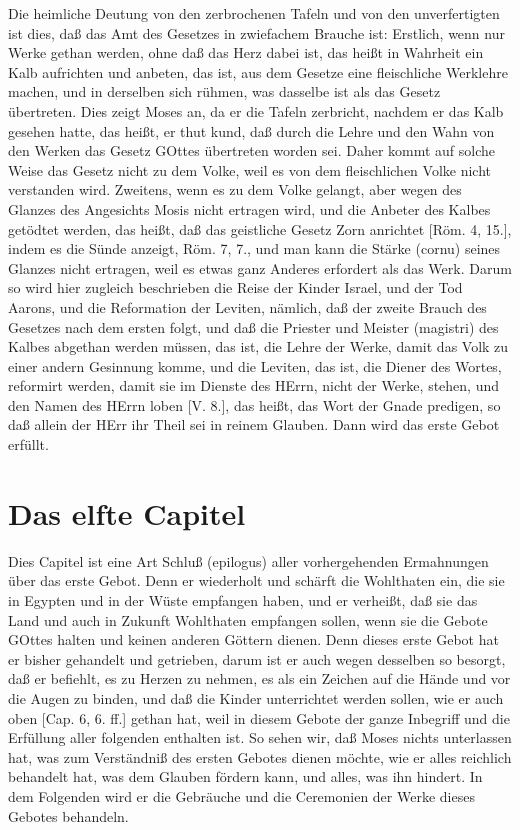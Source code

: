 Die heimliche Deutung von den zerbrochenen Tafeln und von den unverfertigten ist dies, daß das Amt des Gesetzes in zwiefachem Brauche ist: Erstlich, wenn nur Werke gethan werden, ohne daß das Herz dabei ist, das heißt in Wahrheit ein Kalb aufrichten und anbeten, das ist, aus dem Gesetze eine fleischliche Werklehre machen, und in derselben sich rühmen, was dasselbe ist als das Gesetz übertreten. Dies zeigt Moses an, da er die Tafeln zerbricht, nachdem er das Kalb gesehen hatte, das heißt, er thut kund, daß durch die Lehre und den Wahn von den Werken das Gesetz GOttes übertreten worden sei. Daher kommt auf solche Weise das Gesetz nicht zu dem Volke, weil es von dem fleischlichen Volke nicht verstanden wird. Zweitens, wenn es zu dem Volke gelangt, aber wegen des Glanzes des Angesichts Mosis nicht ertragen wird, und die Anbeter des Kalbes getödtet werden, das heißt, daß das geistliche Gesetz Zorn anrichtet [Röm. 4, 15.], indem es die Sünde anzeigt, Röm. 7, 7., und man kann die Stärke (cornu) seines Glanzes nicht ertragen, weil es etwas ganz Anderes erfordert als das Werk. Darum so wird hier zugleich beschrieben die Reise der Kinder Israel, und der Tod Aarons, und die Reformation der Leviten, nämlich, daß der zweite Brauch des Gesetzes nach dem ersten folgt, und daß die Priester und Meister (magistri) des Kalbes abgethan werden müssen, das ist, die Lehre der Werke, damit das Volk zu einer andern Gesinnung komme, und die Leviten, das ist, die Diener des Wortes, reformirt werden, damit sie im Dienste des HErrn, nicht der Werke, stehen, und den Namen des HErrn loben [V. 8.], das heißt, das Wort der Gnade predigen, so daß allein der HErr ihr Theil sei in reinem Glauben. Dann wird das erste Gebot erfüllt.

\section{Das elfte Capitel}

Dies Capitel ist eine Art Schluß (epilogus) aller vorhergehenden Ermahnungen über das erste Gebot. Denn er wiederholt und schärft die Wohlthaten ein, die sie in Egypten und in der Wüste empfangen haben, und er verheißt, daß sie das Land und auch in Zukunft Wohlthaten empfangen sollen, wenn sie die Gebote GOttes halten und keinen anderen Göttern dienen. Denn dieses erste Gebot hat er bisher gehandelt und getrieben, darum ist er auch wegen desselben so besorgt, daß er befiehlt, es zu Herzen zu nehmen, es als ein Zeichen auf die Hände und vor die Augen zu binden, und daß die Kinder unterrichtet werden sollen, wie er auch oben [Cap. 6, 6. ff.] gethan hat, weil in diesem Gebote der ganze Inbegriff und die Erfüllung aller folgenden enthalten ist. So sehen wir, daß Moses nichts unterlassen hat, was zum Verständniß des ersten Gebotes dienen möchte, wie er alles reichlich behandelt hat, was dem Glauben fördern kann, und alles, was ihn hindert. In dem Folgenden wird er die Gebräuche und die Ceremonien der Werke dieses Gebotes behandeln.


